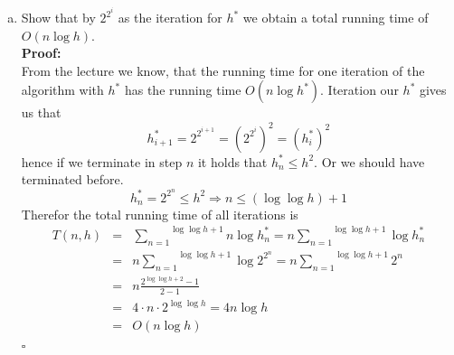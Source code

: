 \documentclass[11pt,a4paper,ngerman]{article}
\begin{document}
\begin{description}
\begin{enumerate}[a)]
    \item Show that by $2^{2^i}$ as the iteration for $h^*$ we obtain
        a total running time of $O(n \log h)$.\\
    \textbf{Proof:}\\
        From the lecture we know, that the running time for
        one iteration of the algorithm with $h^*$ has the running time
        $O(n \log h^*)$.
        Iteration our $h^*$ gives us that 
        $$
            h^*_{i+1} = 2^{2^{i+1}} = \left( 2^{2^i}\right)^2 = \left( h^*_i \right)^2
        $$
        hence if we terminate in step $n$ it holds that $h^*_n \leq h^2$. Or
        we should have terminated before.\\
        \begin{equation}
            h^*_n = 2^{2^n} \leq h^2 \Rightarrow n \leq (\log \log h) + 1
        \end{equation}
        Therefor the total running time of all iterations is
        \begin{equation}
        \begin{aligned}
            T(n, h) &=& \overset{\log \log h + 1}{\underset{n = 1}{\sum}} n \log h^*_n
            = n \overset{\log \log h + 1}{\underset{n=1}{\sum}} \log h^*_n\\
            &=& n \overset{\log \log h + 1}{\underset{n=1}{\sum}} \log 2^{2^n}
            = n \overset{\log \log h + 1}{\underset{n=1}{\sum}} 2^n\\
            &=& n \frac{2^{\log \log h + 2} - 1}{2 - 1}\\
            &=& 4 \cdot n \cdot 2^{\log \log h}
            = 4 n \log h\\
            &=& O (n \log h)
        \end{aligned}
        \end{equation}
    \mbox{}\hfill$\square$
  \end{enumerate}

\end{description}

\label{LastPage}
\end{document}
